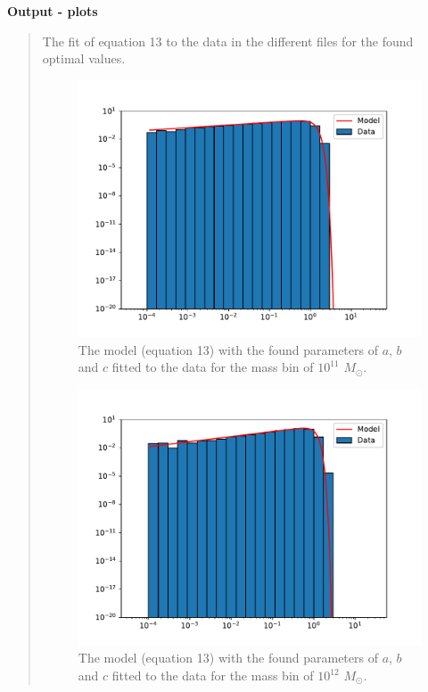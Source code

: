 \textbf{Output - plots}
\begin{quote}
The fit of equation 13 to the data in the different files for the found optimal values. 

\begin{figure}[!h]
\centering
\includegraphics[scale=0.7]{plots/satgals_m11.pdf}
\caption{The model (equation 13) with the found parameters of $a$, $b$ and $c$ fitted to the data for the mass bin of $10^{11}$ $M_{\odot}$.}

\end{figure}
\newpage

\begin{figure}[!h]
\centering
\includegraphics[scale=0.7]{plots/satgals_m12.pdf}
\caption{The model (equation 13) with the found parameters of $a$, $b$ and $c$ fitted to the data for the mass bin of $10^{12}$ $M_{\odot}$.}


\end{figure}
\end{quote}
